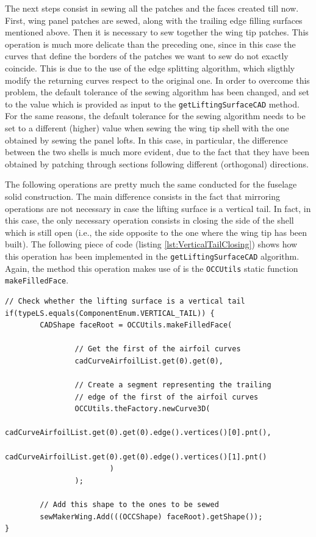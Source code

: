 \bigskip
\noindent
The next steps consist in sewing all the patches and the faces created till now. First, wing panel patches are sewed, along with the trailing edge filling surfaces mentioned above. Then it is necessary to sew together the wing tip patches. This operation is much more delicate than the preceding one, since in this case the curves that define the borders of the patches we want to sew do not exactly coincide. This is due to the use of the edge splitting algorithm, which sligthly modify the returning curves respect to the original one. In order to overcome this problem, the default tolerance of the sewing algorithm has been changed, and set to the value which is provided as input to the \lstinline[language=Java]!getLiftingSurfaceCAD! method. For the same reasons, the default tolerance for the sewing algorithm needs to be set to a different (higher) value when sewing the wing tip shell with the one obtained by sewing the panel lofts. In this case, in particular, the difference between the two shells is much more evident, due to the fact that they have been obtained by patching through sections following different (orthogonal) directions.

\bigskip
\noindent
The following operations are pretty much the same conducted for the fuselage solid construction. The main difference consists in the fact that mirroring operations are not necessary in case the lifting surface is a vertical tail. In fact, in this case, the only necessary operation consists in closing the side of the shell which is still open (i.e., the side opposite to the one where the wing tip has been built). The following piece of code (listing \ref{lst:VerticalTailClosing}) shows how this operation has been implemented in the \lstinline[language=Java]!getLiftingSurfaceCAD! algorithm. Again, the method this operation makes use of is the \lstinline[language=Java]!OCCUtils! static function \lstinline[language=Java]!makeFilledFace!.
%
\bigskip
\begin{lstlisting}[caption={Vertical tail filling operations}, captionpos=b, tabsize=2, label={lst:VerticalTailClosing}]
// Check whether the lifting surface is a vertical tail
if(typeLS.equals(ComponentEnum.VERTICAL_TAIL)) {
		CADShape faceRoot = OCCUtils.makeFilledFace(
		
		 		// Get the first of the airfoil curves
				cadCurveAirfoilList.get(0).get(0),  
				
				// Create a segment representing the trailing
				// edge of the first of the airfoil curves
				OCCUtils.theFactory.newCurve3D( 
						cadCurveAirfoilList.get(0).get(0).edge().vertices()[0].pnt(), 
						cadCurveAirfoilList.get(0).get(0).edge().vertices()[1].pnt()
						) 
				);
				
		// Add this shape to the ones to be sewed	
		sewMakerWing.Add(((OCCShape) faceRoot).getShape()); 
}		
\end{lstlisting}

